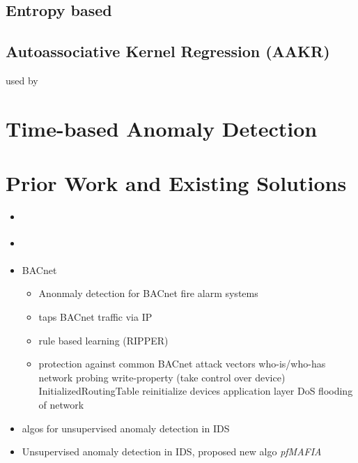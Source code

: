 	

	\subsection{Entropy based}
	\subsection{Autoassociative Kernel Regression (AAKR)}
		used by \textcite{Yang2006}

\section{Time-based Anomaly Detection}

\section{Prior Work and Existing Solutions}
\begin{itemize}
	\item \parencite{Yang2006}
	\item \parencite{Celeda2012}
	\item \textcite{Pan2014} BACnet
		\begin{itemize}
			\item Anonmaly detection for BACnet fire alarm systems
			\item taps BACnet traffic via IP
			\item rule based learning (RIPPER)
			\item protection against common BACnet attack vectors
				\subitem who-is/who-has network probing
				\subitem write-property (take control over device)
				\subitem InitializedRoutingTable
				\subitem reinitialize devices
				\subitem application layer DoS
				\subitem flooding of network
		\end{itemize}
	
	\item \textcite{Eskin2002} algos for unsupervised anomaly detection in IDS
	\item \textcite{Leung2005} Unsupervised anomaly detection in IDS, proposed new algo \emph{pfMAFIA}
\end{itemize}

